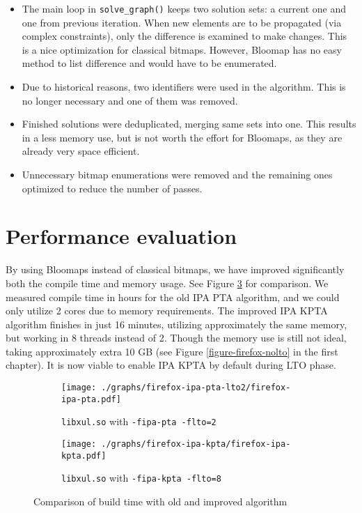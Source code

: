 \begin{itemize}
	\item The main loop in {\tt solve\_graph()} keeps two solution sets: a
		current one and one from previous iteration. When new elements are to
		be propagated (via complex constraints), only the difference is
		examined to make changes. This is a nice optimization for classical
		bitmaps. However, Bloomap has no easy method to list difference and
		would have to be enumerated. 
	\item Due to historical reasons, two identifiers were used in the
		algorithm. This is no longer necessary and one of them was removed.
	\item Finished solutions were deduplicated, merging same sets into one. This
		results in a less memory use, but is not worth the effort
		for Bloomaps, as they are already very space efficient.
	\item Unnecessary bitmap enumerations were removed and the remaining ones
		optimized to reduce the number of passes.
\end{itemize}

\section{Performance evaluation}

By using Bloomaps instead of classical bitmaps, we have improved significantly
both the compile time and memory usage. See Figure
\ref{figure-new-old-comparison} for comparison. We measured compile time in
hours for the old IPA PTA algorithm, and we could only utilize 2 cores due to
memory requirements. The improved IPA KPTA algorithm finishes in just 16 minutes,
utilizing approximately the same memory, but working in 8 threads instead of 2.
Though the memory use is still not ideal, taking approximately extra 10 GB (see
Figure \ref{figure-firefox-nolto} in the first chapter). It is now viable to
enable IPA KPTA by default during LTO phase.

\begin{figure}[!ht]
\begin{subfigure}[b]{\textwidth}
	\centering
	\texttt{[image: ./graphs/firefox-ipa-pta-lto2/firefox-ipa-pta.pdf]}
	\caption{{\tt libxul.so} with {\tt -fipa-pta -flto=2}}
	\label{figure-firefox-ipa-pta-lto2-2}
\end{subfigure}
\begin{subfigure}[b]{\textwidth}
	\centering
	\texttt{[image: ./graphs/firefox-ipa-kpta/firefox-ipa-kpta.pdf]}
	\caption{{\tt libxul.so} with {\tt -fipa-kpta -flto=8}}
	\label{figure-firefox-ipa-kpta}
\end{subfigure}
\caption{Comparison of build time with old and improved algorithm}
	\label{figure-new-old-comparison}
\end{figure}

